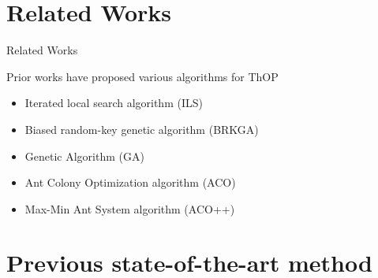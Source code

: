\documentclass[aspectratio=169]{beamer}
\begin{document}
\section{Related Works}
\begin{frame}{Related Works}
    \begin{block}{Prior works have proposed various algorithms for ThOP}
        \small
        \begin{itemize}
            \item Iterated local search algorithm (ILS)\footnotemark[1]
            \item Biased random-key genetic algorithm (BRKGA)\footnotemark[1]
            \item Genetic Algorithm (GA)\footnotemark
            \item Ant Colony Optimization algorithm (ACO)\footnotemark
            \item Max-Min Ant System algorithm (ACO++)\footnotemark
        \end{itemize}
    \end{block}
\end{frame}
\section{Previous state-of-the-art method}
\end{document}
